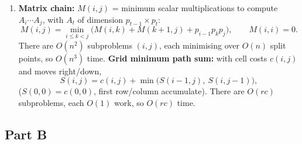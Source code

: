 \documentclass[11pt]{article}
\begin{document}
\begin{enumerate}[label=\textbf{A\arabic*.}, leftmargin=2.2em]
\item \textbf{Matrix chain:} $M(i,j)$ = minimum scalar multiplications to compute
$A_i\cdots A_j$, with $A_t$ of dimension $p_{t-1}\times p_t$:
\[
M(i,j) = \min_{i\le k < j}\big( M(i,k) + M(k+1,j) + p_{i-1}p_k p_j\big), \qquad M(i,i)=0.
\]
There are $O(n^2)$ subproblems $(i,j)$, each minimising over $O(n)$ split points, so
$O(n^3)$ time. \textbf{Grid minimum path sum:} with cell costs $c(i,j)$ and moves
right/down,
\[
S(i,j) = c(i,j) + \min\big( S(i-1,j),\ S(i,j-1)\big),
\]
($S(0,0) = c(0,0)$, first row/column accumulate). There are $O(rc)$ subproblems, each $O(1)$
work, so $O(rc)$ time.

\end{enumerate}

\subsection*{Part B}
\end{document}
